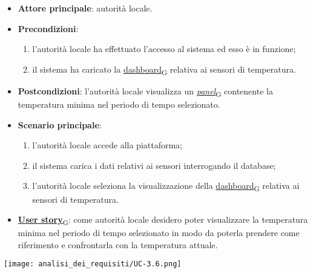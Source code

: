 \begin{itemize}
	\item \textbf{Attore principale}: autorità locale.
	\item \textbf{Precondizioni}:
	      \begin{enumerate}
		      \item l'autorità locale ha effettuato l'accesso al sistema ed esso è in funzione;
		      \item il sistema ha caricato la \href{https://7last.github.io/docs/pb/documentazione-interna/glossario\#dashboard}{dashboard\textsubscript{G}} relativa ai sensori di temperatura.
	      \end{enumerate}
	\item \textbf{Postcondizioni}: l'autorità locale visualizza un \href{https://7last.github.io/docs/pb/documentazione-interna/glossario\#panel}{\textit{panel}\textsubscript{G}} contenente la temperatura minima nel periodo di tempo selezionato.
	\item \textbf{Scenario principale}:
	      \begin{enumerate}
		      \item l'autorità locale accede alla piattaforma;
		      \item il sistema carica i dati relativi ai sensori interrogando il database;
		      \item l'autorità locale seleziona la visualizzazione della \href{https://7last.github.io/docs/pb/documentazione-interna/glossario\#dashboard}{dashboard\textsubscript{G}} relativa ai sensori di temperatura.
	      \end{enumerate}
	\item \href{https://7last.github.io/docs/pb/documentazione-interna/glossario\#user-story}{\textbf{User story}\textsubscript{G}}:
	      come autorità locale desidero poter visualizzare la temperatura minima nel periodo di tempo selezionato
	      in modo da poterla prendere come riferimento e confrontarla con la temperatura attuale.
\end{itemize}
\begin{center}
	\texttt{[image: analisi\_dei\_requisiti/UC-3.6.png]}
\end{center}

